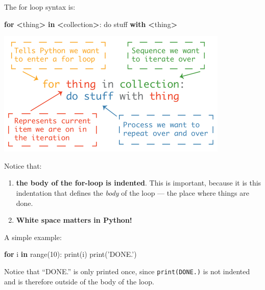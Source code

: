 \documentclass[
]{book}
\newenvironment{Shaded}{\begin{snugshade}}{\end{snugshade}}
\newcommand{\BuiltInTok}[1]{#1}
\newcommand{\ControlFlowTok}[1]{\textcolor[rgb]{0.13,0.29,0.53}{\textbf{#1}}}
\newcommand{\DecValTok}[1]{\textcolor[rgb]{0.00,0.00,0.81}{#1}}
\newcommand{\KeywordTok}[1]{\textcolor[rgb]{0.13,0.29,0.53}{\textbf{#1}}}
\newcommand{\NormalTok}[1]{#1}
\newcommand{\OperatorTok}[1]{\textcolor[rgb]{0.81,0.36,0.00}{\textbf{#1}}}
\newcommand{\StringTok}[1]{\textcolor[rgb]{0.31,0.60,0.02}{#1}}
\providecommand{\tightlist}{%
  \setlength{\itemsep}{0pt}\setlength{\parskip}{0pt}}
\begin{document}
The for loop syntax is:

\begin{Shaded}
\begin{Highlighting}[]
\ControlFlowTok{for} \OperatorTok{<}\NormalTok{thing}\OperatorTok{>} \KeywordTok{in} \OperatorTok{<}\NormalTok{collection}\OperatorTok{>}\NormalTok{:}
\NormalTok{    do stuff }\ControlFlowTok{with} \OperatorTok{<}\NormalTok{thing}\OperatorTok{>}
\end{Highlighting}
\end{Shaded}

\includegraphics{Python/PythonIntro/images/python_for_loop_small.png}

Notice that:

\begin{enumerate}
\def\labelenumi{\arabic{enumi}.}
\tightlist
\item
  \textbf{the body of the for-loop is indented}. This is important, because it is this indentation that defines the \emph{body} of the loop --- the place where things are done.
\item
  \textbf{White space matters in Python!}
\end{enumerate}

A simple example:

\begin{Shaded}
\begin{Highlighting}[]
\ControlFlowTok{for}\NormalTok{ i }\KeywordTok{in} \BuiltInTok{range}\NormalTok{(}\DecValTok{10}\NormalTok{):}
    \BuiltInTok{print}\NormalTok{(i)}
\BuiltInTok{print}\NormalTok{(}\StringTok{'DONE.'}\NormalTok{)}
\end{Highlighting}
\end{Shaded}

Notice that ``DONE.'' is only printed once, since \texttt{print(\textquotesingle{}DONE.\textquotesingle{})} is not indented and is therefore outside of the body of the loop.
\end{document}
